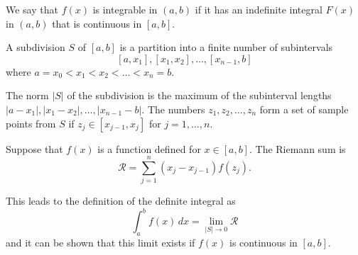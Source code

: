 \documentclass[10pt, a4paper]{article}
\begin{document}
\begin{definition}
    We say that $f(x)$ is integrable in $(a, b)$ if it has an indefinite integral $F(x)$ in $(a, b)$ that is continuous in $[a, b]$.
\end{definition}

\begin{definition}
    A subdivision $S$ of $[a, b]$ is a partition into a finite number of subintervals
    \[
    [a, x_1], [x_1, x_2], \dotsc, [x_{n - 1}, b]
    \]
    where $a = x_0 < x_1 < x_2 < \dotsc < x_n = b$.
\end{definition}
The norm $|S|$ of the subdivision is the maximum of the subinterval lengths $|a - x_1|, |x_1 - x_2|, \dotsc, |x_{n - 1} - b|$.
The numbers $z_1, z_2, \dotsc, z_n$ form a set of sample points from $S$ if $z_j \in [x_{j - 1}, x_j]$ for $j = 1,\dotsc, n$.

\begin{definition}
    Suppose that $f(x)$ is a function defined for $x \in [a, b]$.
    The Riemann sum is
    \[
    \mathcal{R} = \sum_{j = 1}^{n}(x_j - x_{j - 1})f(z_j).
    \]
\end{definition}
This leads to the definition of the definite integral as
\[
\int_{a}^{b}f(x)\,dx = \lim_{|S| \rightarrow 0}\mathcal{R}
\]
and it can be shown that this limit exists if $f(x)$ is continuous in $[a, b]$.
\end{document}
